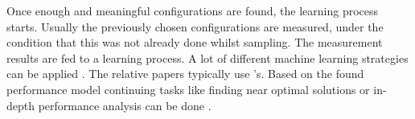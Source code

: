 Once enough and meaningful configurations are found, the learning process starts. Usually the previously chosen configurations are measured, under the condition that this was not already done whilst sampling. The measurement results are fed to a learning process. A lot of different machine learning strategies can be applied \cite{VAMOSConference}. The relative papers typically use \CART's. Based on the found performance model continuing tasks like finding near optimal solutions or in-depth performance analysis can be done \cite{VAMOSConference}.


%







